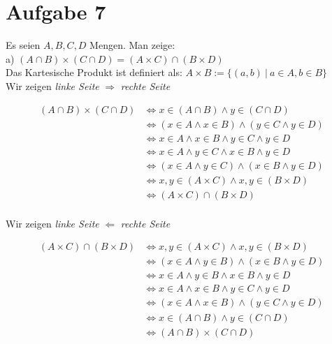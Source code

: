 \section*{Aufgabe 7}

Es seien $A, B, C, D$ Mengen. Man zeige:\\

a) $(A \cap B) \times (C \cap D) = (A \times C) \cap (B \times D)$\\

Das Kartesische Produkt ist definiert als: $A \times B := \{(a,b) \ | \ a \in A, b \in B\}$\\

Wir zeigen \textit{linke Seite} $\Rightarrow$ \textit{rechte Seite}

\begin{align*}
(A \cap B) \times (C \cap D) &\Leftrightarrow x \in (A \cap B) \land y \in (C \cap D)\\
&\Leftrightarrow (x \in A \land x \in B) \land (y \in C \land y \in D)\\
&\Leftrightarrow x \in A \land x \in B \land y \in C \land y \in D\\
&\Leftrightarrow x \in A \land y \in C \land x \in B \land y \in D\\
&\Leftrightarrow (x \in A \land y \in C) \land (x \in B \land y \in D)\\
&\Leftrightarrow x,y \in (A \times C) \land x,y \in (B \times D)\\
&\Leftrightarrow (A \times C) \cap (B \times D)\\
\end{align*}

Wir zeigen \textit{linke Seite} $\Leftarrow$ \textit{rechte Seite}

\begin{align*}
(A \times C) \cap (B \times D) &\Leftrightarrow x,y \in (A \times C) \land x,y \in (B \times D)\\
&\Leftrightarrow (x \in A \land y \in B) \land (x \in B \land y \in D)\\
&\Leftrightarrow x \in A \land y \in B \land x \in B \land y \in D\\
&\Leftrightarrow x \in A \land x \in B \land y \in C \land y \in D\\
&\Leftrightarrow (x \in A \land x \in B) \land (y \in C \land y \in D)\\
&\Leftrightarrow x \in (A \cap B) \land y \in (C \cap D)\\
&\Leftrightarrow (A \cap B) \times (C \cap D)\\
\end{align*}


